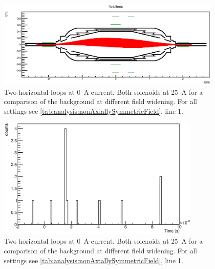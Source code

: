 \begin{figure}
\centering
	\centerline{\includegraphics[width = 1.3\linewidth]{graphics/analysis/monSpec/fieldSimulation/NC.eps} }
	
	\caption[\SI{50}{\ampere} loops]{Two horizontal loops at \SI{0}{\ampere} current. Both solenoids at \SI{25}{\ampere} for a comparison of the background at different field widening. For all settings see \ref{tab:analysis:nonAxiallySymmetricField}, line 1.}
	\label{fig:NCf}
\end{figure}

\begin{figure}[h]
\centering
	\includegraphics[width = 0.9\textwidth]{graphics/analysis/monSpec/NC.eps}
	\caption[\SI{50}{\ampere} loops]{Two horizontal loops at \SI{0}{\ampere} current. Both solenoids at \SI{25}{\ampere} for a comparison of the background at different field widening. For all settings see \ref{tab:analysis:nonAxiallySymmetricField}, line 1.}
	\label{fig:NC}
\end{figure}
\clearpage








